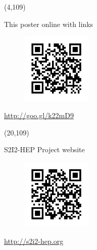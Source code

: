 \documentclass[final]{beamer}
\begin{document}
\begin{frame}{}
\begin{textblock}{14.0}(4,109)
\begin{block}{This poster online with links}
\begin{figure}[tbph]
\centering
\includegraphics[width=0.30\textwidth]{images/qr-s2i2-hep-si2-pi-workshop-2017.png}
\end{figure}
\begin{center}
\url{http://goo.gl/k22mD9}
\end{center}
\end{block}
\end{textblock}


\begin{textblock}{14.0}(20,109)
\begin{block}{S2I2-HEP Project website}
\begin{figure}[tbph]
\centering
\includegraphics[width=0.30\textwidth]{images/qr-s2i2-hep.png}
\end{figure}
\begin{center}
\url{http://s2i2-hep.org}
\end{center}
\end{block}
\end{textblock}







\end{frame}
\end{document}
